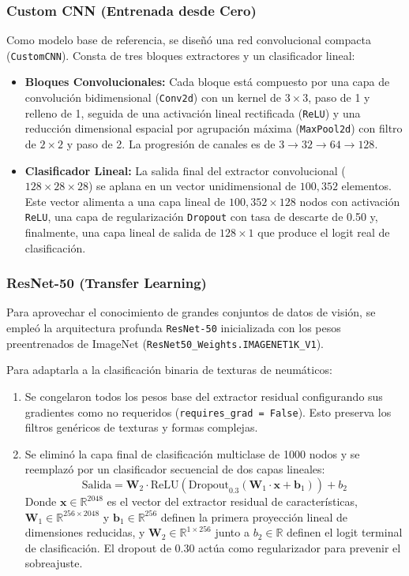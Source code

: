 \subsubsection{Custom CNN (Entrenada desde Cero)}
Como modelo base de referencia, se diseñó una red convolucional compacta (\texttt{CustomCNN}). Consta de tres bloques extractores y un clasificador lineal:
\begin{itemize}
    \item \textbf{Bloques Convolucionales:} Cada bloque está compuesto por una capa de convolución bidimensional (\texttt{Conv2d}) con un kernel de $3 \times 3$, paso de 1 y relleno de 1, seguida de una activación lineal rectificada (\texttt{ReLU}) y una reducción dimensional espacial por agrupación máxima (\texttt{MaxPool2d}) con filtro de $2 \times 2$ y paso de 2. La progresión de canales es de $3 \to 32 \to 64 \to 128$.
    \item \textbf{Clasificador Lineal:} La salida final del extractor convolucional ($128 \times 28 \times 28$) se aplana en un vector unidimensional de $100,352$ elementos. Este vector alimenta a una capa lineal de $100,352 \times 128$ nodos con activación \texttt{ReLU}, una capa de regularización \texttt{Dropout} con tasa de descarte de 0.50 y, finalmente, una capa lineal de salida de $128 \times 1$ que produce el logit real de clasificación.
\end{itemize}

\subsubsection{ResNet-50 (Transfer Learning)}
Para aprovechar el conocimiento de grandes conjuntos de datos de visión, se empleó la arquitectura profunda \texttt{ResNet-50} inicializada con los pesos preentrenados de ImageNet (\texttt{ResNet50\_Weights.IMAGENET1K\_V1}).

Para adaptarla a la clasificación binaria de texturas de neumáticos:
\begin{enumerate}
    \item Se congelaron todos los pesos base del extractor residual configurando sus gradientes como no requeridos (\texttt{requires\_grad = False}). Esto preserva los filtros genéricos de texturas y formas complejas.
    \item Se eliminó la capa final de clasificación multiclase de 1000 nodos y se reemplazó por un clasificador secuencial de dos capas lineales:
    \begin{equation}
    \text{Salida} = \mathbf{W}_2 \cdot \text{ReLU}(\text{Dropout}_{0.3}(\mathbf{W}_1 \cdot \mathbf{x} + \mathbf{b}_1)) + b_2
    \end{equation}
    Donde $\mathbf{x} \in \mathbb{R}^{2048}$ es el vector del extractor residual de características, $\mathbf{W}_1 \in \mathbb{R}^{256 \times 2048}$ y $\mathbf{b}_1 \in \mathbb{R}^{256}$ definen la primera proyección lineal de dimensiones reducidas, y $\mathbf{W}_2 \in \mathbb{R}^{1 \times 256}$ junto a $b_2 \in \mathbb{R}$ definen el logit terminal de clasificación. El dropout de 0.30 actúa como regularizador para prevenir el sobreajuste.
\end{enumerate}

